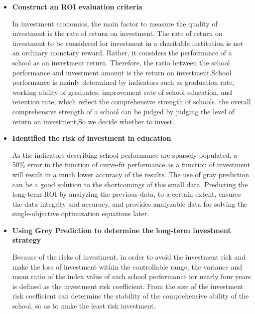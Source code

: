 \documentclass{mcmthesis}
\begin{document}
\begin{itemize}
	\item \textbf{Construct an ROI evaluation criteria}

	\par In investment economics, the main factor to measure the quality of investment is the rate of return on investment. The rate of return on investment to be considered for investment in a charitable institution is not an ordinary monetary reward. Rather, it considers the performance of a school as an investment return. Therefore, the ratio between the school performance and investment amount is the return on investment.School performance is mainly determined by indicators such as graduation rate, working ability of graduates, improvement rate of school education, and retention rate, which reflect the comprehensive strength of schools. the overall comprehensive strength of a school can be judged by judging the level of return on investment,So we decide whether to invest.
	
	
	\item \textbf{Identified the risk of investment in education}
	
	\par As the indicators describing school performance are sparsely populated, a 50\% error in the function of curve-fit performance as a function of investment will result in a much lower accuracy of the results. The use of gray prediction can be a good solution to the shortcomings of this small data. Predicting the long-term ROI by analyzing the previous data, to a certain extent, ensures the data integrity and accuracy, and provides analyzable data for solving the single-objective optimization equations later.
	
	\item \textbf{Using Grey Prediction to determine the long-term investment strategy}	
	
	\par Because of the risks of investment, in order to avoid the investment risk and make the loss of investment within the controllable range, the variance and mean ratio of the index value of each school performance for nearly four years is defined as the investment risk coefficient. From the size of the investment risk coefficient can determine the stability of the comprehensive ability of the school, so as to make the least risk investment.

		
\end{itemize}


\end{document}
